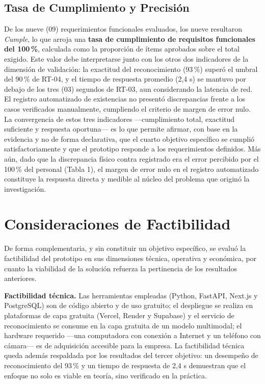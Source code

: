 \documentclass[12pt, letterpaper]{report}
\begin{document}
\subsection{Tasa de Cumplimiento y Precisión}

De los nueve (09) requerimientos funcionales evaluados, los nueve
resultaron \textit{Cumple}, lo que arroja una \textbf{tasa de
cumplimiento de requisitos funcionales del 100\,\%}, calculada como la
proporción de ítems aprobados sobre el total exigido. Este valor debe
interpretarse junto con los otros dos indicadores de la dimensión de
validación: la exactitud del reconocimiento (93\,\%) superó el umbral
del 90\,\% de RT-04, y el tiempo de respuesta promedio (2,4 s) se
mantuvo por debajo de los tres (03) segundos de RT-03, aun
considerando la latencia de red. El registro automatizado de
existencias no presentó discrepancias frente a los casos verificados
manualmente, cumpliendo el criterio de margen de error nulo. La
convergencia de estos tres indicadores ---cumplimiento total, exactitud
suficiente y respuesta oportuna--- es lo que permite afirmar, con base
en la evidencia y no de forma declarativa, que el cuarto objetivo
específico se cumplió satisfactoriamente y que el prototipo responde a
los requerimientos definidos. Más aún, dado que la discrepancia físico
contra registrado era el error percibido por el 100\,\% del personal
(Tabla 1), el margen de error nulo en el registro automatizado
constituye la respuesta directa y medible al núcleo del problema que
originó la investigación.

\section{Consideraciones de Factibilidad}

De forma complementaria, y sin constituir un objetivo específico, se
evaluó la factibilidad del prototipo en sus dimensiones técnica,
operativa y económica, por cuanto la viabilidad de la solución refuerza
la pertinencia de los resultados anteriores.

\textbf{Factibilidad técnica.} Las herramientas empleadas (Python,
FastAPI, Next.js y PostgreSQL) son de código abierto y de uso
gratuito; el despliegue se realiza en plataformas de capa gratuita
(Vercel, Render y Supabase) y el servicio de reconocimiento se consume
en la capa gratuita de un modelo multimodal; el hardware requerido
---una computadora con conexión a Internet y un teléfono con cámara---
es de adquisición accesible para la empresa. La factibilidad técnica
queda además respaldada por los resultados del tercer objetivo: un
desempeño de reconocimiento del 93\,\% y un tiempo de respuesta de
2,4 s demuestran que el enfoque no solo es viable en teoría, sino
verificado en la práctica.
\end{document}
